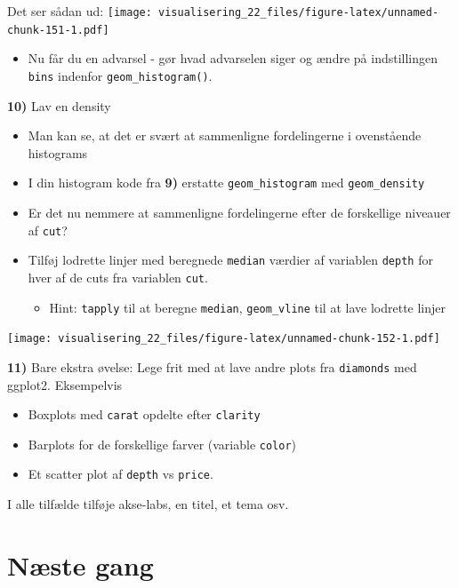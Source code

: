 \documentclass[
]{book}
\providecommand{\tightlist}{%
  \setlength{\itemsep}{0pt}\setlength{\parskip}{0pt}}
\begin{document}
Det ser sådan ud:
\texttt{[image: visualisering\_22\_files/figure-latex/unnamed-chunk-151-1.pdf]}

\begin{itemize}
\tightlist
\item
  Nu får du en advarsel - gør hvad advarselen siger og ændre på indstillingen \texttt{bins} indenfor \texttt{geom\_histogram()}.
\end{itemize}

\textbf{10)} Lav en density

\begin{itemize}
\tightlist
\item
  Man kan se, at det er svært at sammenligne fordelingerne i ovenstående histograms
\item
  I din histogram kode fra \textbf{9)} erstatte \texttt{geom\_histogram} med \texttt{geom\_density}
\item
  Er det nu nemmere at sammenligne fordelingerne efter de forskellige niveauer af \texttt{cut}?
\item
  Tilføj lodrette linjer med beregnede \texttt{median} værdier af variablen \texttt{depth} for hver af de cuts fra variablen \texttt{cut}.

  \begin{itemize}
  \tightlist
  \item
    Hint: \texttt{tapply} til at beregne \texttt{median}, \texttt{geom\_vline} til at lave lodrette linjer
  \end{itemize}
\end{itemize}

\texttt{[image: visualisering\_22\_files/figure-latex/unnamed-chunk-152-1.pdf]}

\textbf{11)} Bare ekstra øvelse: Lege frit med at lave andre plots fra \texttt{diamonds} med ggplot2. Eksempelvis

\begin{itemize}
\tightlist
\item
  Boxplots med \texttt{carat} opdelte efter \texttt{clarity}
\item
  Barplots for de forskellige farver (variable \texttt{color})
\item
  Et scatter plot af \texttt{depth} vs \texttt{price}.
\end{itemize}

I alle tilfælde tilføje akse-labs, en titel, et tema osv.

\hypertarget{nuxe6ste-gang}{%
\section{Næste gang}\label{nuxe6ste-gang}}
\end{document}
